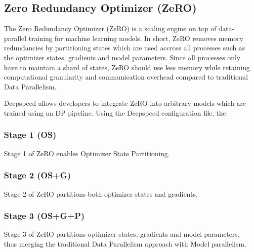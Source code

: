 \subsection{Zero Redundancy Optimizer (ZeRO)}

The Zero Redundancy Optimizer (ZeRO) is a scaling engine on top of data-parallel training for 
machine learning models. In short, ZeRO removes memory redundancies by partitioning states which 
are used accross all processes such as the optimizer states, gradients and model parameters. 
Since all processes only have to maintain a shard of states, ZeRO should use less memory while 
retaining computational granularity and communication overhead compared to traditional Data 
Parallelism.

Deepspeed allows developers to integrate ZeRO into arbitrary models which are trained using an 
DP pipeline. Using the Deepspeed configuration file, the 

\subsubsection{Stage 1 (OS)}

Stage 1 of ZeRO enables Optimizer State Partitioning. 

\subsubsection{Stage 2 (OS+G)}

Stage 2 of ZeRO partitions both optimizer states and gradients.

\subsubsection{Stage 3 (OS+G+P)}

Stage 3 of ZeRO partitions optimizer states, gradients and model parameters, thus merging the 
traditional Data Parallelism approach with Model parallelism.


